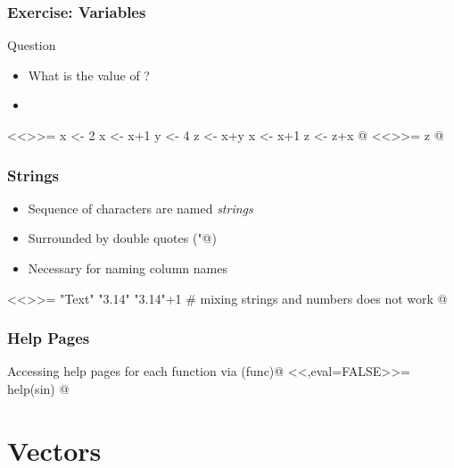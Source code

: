 \documentclass[%
  final,
  11pt, 
  show notes, %
  t, %
  fleqn, %
]{beamer}
\begin{document}
\begin{frame}[fragile]
  \frametitle{Exercise: Variables}
\vfill
\begin{exampleblock}{Question}
\begin{itemize}
\item What is the value of \verb@z@?
\item \CourseQuiz
\end{itemize}
\end{exampleblock}
<<>>=
x <- 2
x <- x+1
y <- 4
z <- x+y
x <- x+1
z <- z+x
@
\ifQuizSolution
\pause
<<>>=
z
@
\fi
\vfill
\end{frame}

\begin{frame}[fragile]
  \frametitle{Strings}
\begin{itemize}
\item Sequence of characters are named \emph{strings}
\item Surrounded by double quotes (\verb@"@)
\item Necessary for \eg naming column names
\end{itemize}
<<>>=
"Text"
"3.14"
"3.14"+1 # mixing strings and numbers does not work
@
\end{frame}

\begin{frame}[fragile]
  \frametitle{Help Pages}
Accessing help pages for each function via \verb@help(func)@
<<,eval=FALSE>>=
help(sin)
@
\begin{center}
\end{center}
\end{frame}


\section{Vectors}
\end{document}
